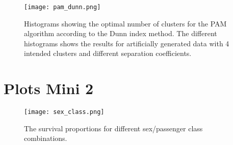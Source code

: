 \documentclass[11pt,twoside,swedish]{article}
\begin{document}
\begin{figure}
\begin{center}
\texttt{[image: pam\_dunn.png]}
\caption{Histograms showing the optimal number of clusters for the PAM
  algorithm according to the Dunn index method. The different
  histograms shows the results for artificially generated data with 4
  intended clusters and different separation coefficients.}
\label{pam_dunn_hists}
\end{center}
\end{figure}


\newpage
\section{Plots Mini 2}\label{Plots Mini 2}

\graphicspath{{/home/mikael/Repos/Courses/msa220/Mini/Mini2/Titanic/}}
\begin{figure}
\begin{center}
\texttt{[image: sex\_class.png]}
\caption{The survival proportions for different sex/passenger class combinations.}
\label{titanic sex pclass}
\end{center}
\end{figure}


\newpage
\printbibliography
\end{document}
